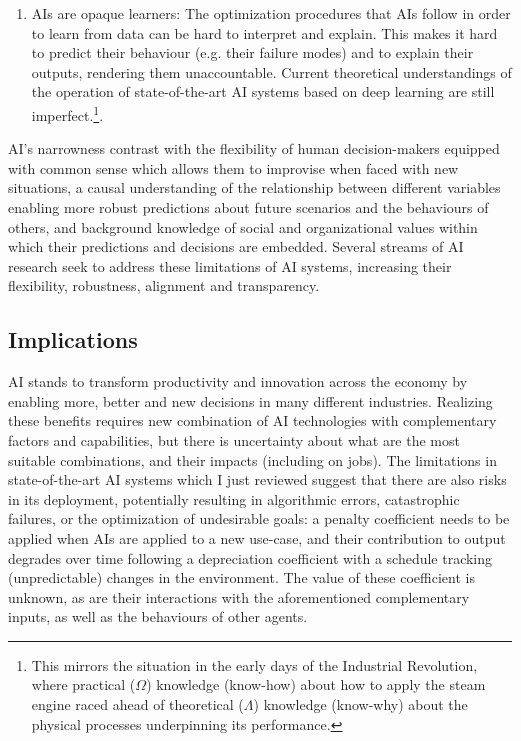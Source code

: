 \documentclass[11pt]{article}
\begin{document}
\begin{enumerate}
    \item AIs are opaque learners: The optimization procedures that AIs follow in order to learn from data can be hard to interpret and explain. This makes it hard to predict their behaviour (e.g. their failure modes) and to explain their outputs, rendering them unaccountable. Current theoretical understandings of the operation of state-of-the-art AI systems based on deep learning are still imperfect.\footnote{This mirrors the situation in the early days of the Industrial Revolution, where practical ($\Omega$) knowledge (know-how) about how to apply the steam engine raced ahead of theoretical ($\Lambda$) knowledge (know-why) about the physical processes underpinning its performance.}.
\end{enumerate}

AI's narrowness contrast with the flexibility of human decision-makers equipped with common sense which allows them to improvise when faced with new situations, a causal understanding of the relationship between different variables enabling more robust predictions about future scenarios and the behaviours of others, and background knowledge of social and organizational values within which their predictions and decisions are embedded. Several streams of AI research seek to address these limitations of AI systems, increasing their flexibility, robustness, alignment and transparency.

\subsection{Implications}
\label{subsec:implications}
AI stands to transform productivity and innovation across the economy by enabling more, better and new decisions in many different industries. Realizing these benefits requires new combination of AI technologies with complementary factors and capabilities, but there is uncertainty about what are the most suitable combinations, and their impacts (including on jobs). The limitations in state-of-the-art AI systems which I just reviewed suggest that there are also risks in its deployment, potentially resulting in algorithmic errors, catastrophic failures, or the optimization of undesirable goals: a penalty coefficient needs to be applied when AIs are applied to a new use-case, and their contribution to output degrades over time following a depreciation coefficient with a schedule tracking (unpredictable) changes in the environment. The value of these coefficient is unknown, as are their interactions with the aforementioned complementary inputs, as well as the behaviours of other agents.
\end{document}
